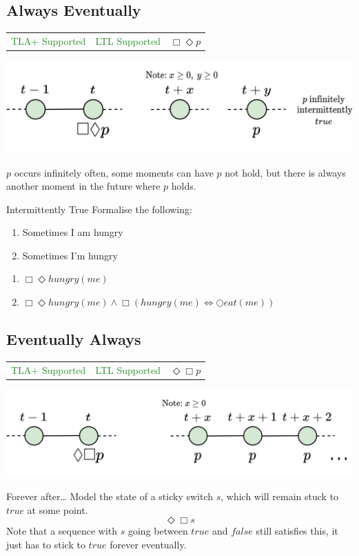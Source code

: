 \subsection{Always Eventually}
\begin{tabular}{c | c r}
    \textcolor{ForestGreen}{TLA+ Supported} & \textcolor{ForestGreen}{LTL Supported} & $\Box \Diamond p$ \\
\end{tabular}
\begin{center}
    \includegraphics[width=.7\textwidth]{linear_time_logic/images/always_eventually.drawio.png}
\end{center}
$p$ occurs infinitely often, some moments can have $p$ not hold, but there is always another moment in the future where $p$ holds.
\begin{examplebox}{Intermittently True}
    Formalise the following:
    \begin{enumerate}
        \item Sometimes I am hungry
        \item Sometimes I'm hungry
    \end{enumerate}
    \tcblower
    \begin{enumerate}
        \item $\Box \Diamond hungry(me)$
        \item $\Box \Diamond hungry(me) \land \Box (hungry(me) \Leftrightarrow \bigcirc eat(me))$
    \end{enumerate}
\end{examplebox}

\subsection{Eventually Always}
\begin{tabular}{c | c r}
    \textcolor{ForestGreen}{TLA+ Supported} & \textcolor{ForestGreen}{LTL Supported} & $\Diamond \Box p$ \\
\end{tabular}
\begin{center}
    \includegraphics[width=.7\textwidth]{linear_time_logic/images/eventually_always_operator.drawio.png}
\end{center}
\begin{examplebox}{Forever after\dots}
    Model the state of a sticky switch $s$, which will remain stuck to $true$ at some point.
    \tcblower
    \[\Diamond \Box s\]
    Note that a sequence with $s$ going between $true$ and $false$ still satisfies this, it just has to stick to $true$ forever eventually.
\end{examplebox}

